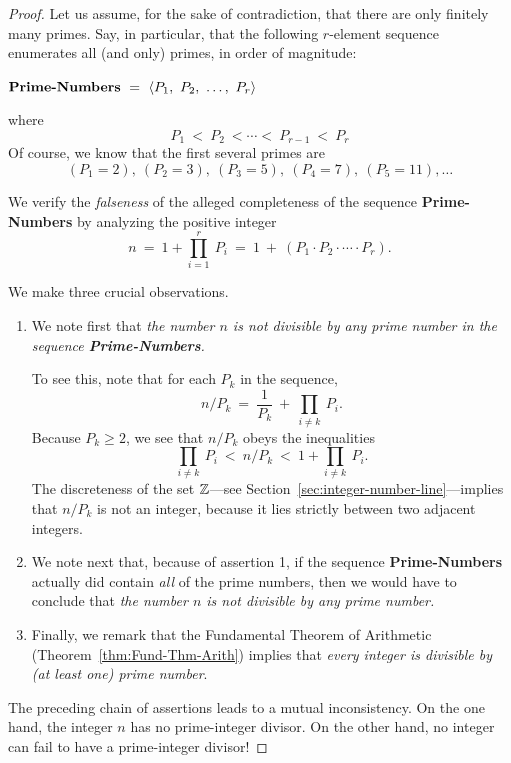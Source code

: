 \begin{proof}
Let us assume, for the sake of contradiction, that there are only
finitely many primes.  Say, in particular, that the following
$r$-element sequence enumerates all (and only) primes, in order of
magnitude:

\noindent
$\mbox{\bf Prime-Numbers} \ = \ 
\langle P_1, \ P_2, \ \ldots, \ P_r \rangle$

\noindent where
\[ P_1 \ < \ P_2 \ < \cdots < \ P_{r-1} \ < \ P_r \]
Of course, we know that the first several primes are
\[ (P_1 =2), \ (P_2 = 3), \ (P_3 =5), \ (P_4 = 7), \ (P_5 =11), \ldots \] 

We verify the {\em falseness} of the alleged completeness of the sequence
{\bf Prime-Numbers} by analyzing the positive integer
\[ n \ = \ 1 + \prod_{i=1}^r \ P_i \ = \ 1 \ + \ 
\left(P_1 \cdot P_2 \cdot \cdots \cdot P_r \right).
\]

We make three crucial observations.

\begin{enumerate}
\item
We note first that {\em the number $n$ is not divisible by any prime
number  in the sequence {\bf Prime-Numbers}.}

To see this, note that for each $P_k$ in the sequence,
\[
n / P_k \ = \ \frac{1}{P_k} \ + \ \prod_{i \neq k} \ P_i .
\]
Because $P_k \geq 2$, we see that $n / P_k$ obeys the inequalities
\[
\prod_{i \neq k} \ P_i \ < \ n/P_k \ < \ 1 + \prod_{i \neq k} \ P_i.
\] 
The discreteness of the set $\mathbb{Z}$---see
Section~\ref{sec:integer-number-line}---implies that $n / P_k$ is not
an integer, because it lies strictly between two adjacent integers.

\item
We note next that, because of assertion 1, if the sequence {\bf
  Prime-Numbers} actually did contain {\em all} of the prime numbers,
then we would have to conclude that {\em the number $n$ is not
  divisible by any prime number.}

\item
Finally, we remark that the Fundamental Theorem of Arithmetic
(Theorem~\ref{thm:Fund-Thm-Arith}) implies that {\em every integer is
  divisible by (at least one) prime number}.
\end{enumerate}
The preceding chain of assertions leads to a mutual inconsistency.  On
the one hand, the integer $n$ has no prime-integer divisor.  On the
other hand, no integer can fail to have a prime-integer divisor!


\end{proof}
